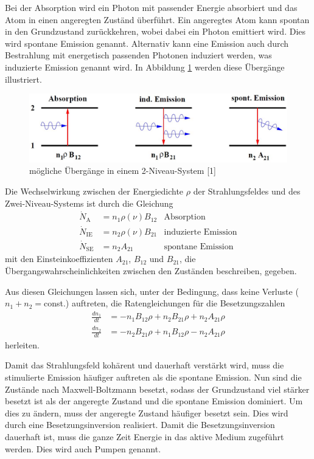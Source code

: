 \documentclass[captions=tableheading]{scrartcl}
\begin{document}
Bei der Absorption wird ein Photon mit passender Energie absorbiert und das Atom in einen angeregten Zuständ überführt. 
Ein angeregtes Atom kann spontan in den Grundzustand zurückkehren, wobei dabei ein Photon emittiert wird. Dies wird spontane Emission genannt.
Alternativ kann eine Emission auch durch Bestrahlung mit energetisch passenden Photonen induziert werden, was induzierte Emission genannt wird.
In Abbildung \ref{fig:schema_uebergaenge} werden diese Übergänge illustriert.
\begin{figure}[h]
 \centering
 \includegraphics[width=12cm]{images/schema_uebergaenge.jpg}
  \caption{mögliche Übergänge in einem 2-Niveau-System [1]}
 \label{fig:schema_uebergaenge}
\end{figure}

Die Wechselwirkung zwischen der Energiedichte $\rho$ der Strahlungsfeldes und des Zwei-Niveau-Systems ist durch die Gleichung
\begin{align}
 \dot{N}_\text{A}   & =n_1 \rho\left(\nu \right)B_{12}  &\text{Absorption} \\
 \dot{N}_\text{IE}  & =n_2 \rho\left(\nu \right)B_{21}  &\text{induzierte Emission} \\
 \dot{N}_\text{SE}  & =n_2 A_{21}                       &\text{spontane Emission}
\end{align}
mit den Einsteinkoeffizienten $A_{21}$, $B_{12}$ und $B_{21}$, die Übergangswahrscheinlichkeiten zwischen den Zuständen beschreiben, gegeben.

Aus diesen Gleichungen lassen sich, unter der Bedingung, dass keine Verluste ($n_1+n_2=$const.) auftreten, die Ratengleichungen für die Besetzungszahlen
\begin{align}
 \frac{d n_1}{d t}&=-n_1B_{12}\rho+n_2B_{21}\rho+n_2A_{21}\rho \\
 \frac{d n_2}{d t}&=-n_2B_{21}\rho+n_1B_{12}\rho-n_2A_{21}\rho
\end{align}
herleiten.

Damit das Strahlungsfeld kohärent und dauerhaft verstärkt wird, muss die stimulierte Emission häufiger auftreten als die spontane Emission. 
Nun sind die Zustände nach Maxwell-Boltzmann besetzt, sodass der Grundzustand viel stärker besetzt ist als der angeregte Zustand und die spontane Emission dominiert.
Um dies zu ändern, muss der angeregte Zustand häufiger besetzt sein. Dies wird durch eine Besetzungsinversion realisiert. 
Damit die Besetzungsinversion dauerhaft ist, muss die ganze Zeit Energie in das aktive Medium zugeführt werden. Dies wird auch Pumpen genannt.
\end{document}
